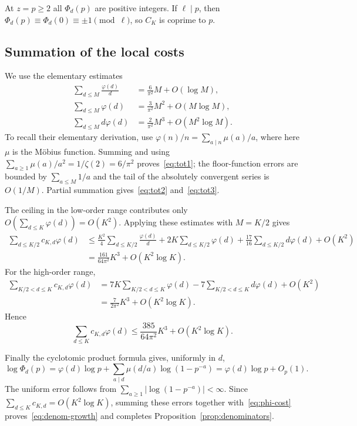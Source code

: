 \documentclass[11pt]{article}
\theoremstyle{remark}
\begin{document}
At $z=p\ge2$ all $\Phi_d(p)$ are positive integers. If $\ell\mid p$,
then $\Phi_d(p)\equiv\Phi_d(0)\equiv\pm1\pmod\ell$, so $C_K$ is
coprime to $p$.

\subsection{Summation of the local costs}

We use the elementary estimates
\begin{align}
 \sum_{d\le M}\frac{\varphi(d)}d
   &=\frac6{\pi^2}M+O(\log M),\label{eq:tot1}\\
 \sum_{d\le M}\varphi(d)
   &=\frac3{\pi^2}M^2+O(M\log M),\label{eq:tot2}\\
 \sum_{d\le M}d\varphi(d)
   &=\frac2{\pi^2}M^3+O(M^2\log M).\label{eq:tot3}
\end{align}
To recall their elementary derivation, use
$\varphi(n)/n=\sum_{a\mid n}\mu(a)/a$, where here $\mu$ is the
M\"obius function. Summing and using
$\sum_{a\ge1}\mu(a)/a^2=1/\zeta(2)=6/\pi^2$ proves~\eqref{eq:tot1};
the floor-function errors are bounded by $\sum_{a\le M}1/a$ and the
tail of the absolutely convergent series is $O(1/M)$.
Partial summation gives~\eqref{eq:tot2} and~\eqref{eq:tot3}.

The ceiling in the low-order range contributes only
$O(\sum_{d\le K}\varphi(d))=O(K^2)$. Applying these estimates with
$M=K/2$ gives
\begin{align*}
 \sum_{d\le K/2}c_{K,d}\varphi(d)
 &\le\frac{K^2}{4}\sum_{d\le K/2}\frac{\varphi(d)}d
   +2K\sum_{d\le K/2}\varphi(d)
   +\frac{17}{16}\sum_{d\le K/2}d\varphi(d)+O(K^2)\\
 &=\frac{161}{64\pi^2}K^3+O(K^2\log K).
\end{align*}
For the high-order range,
\begin{align*}
 \sum_{K/2<d\le K}c_{K,d}\varphi(d)
 &=7K\sum_{K/2<d\le K}\varphi(d)
     -7\sum_{K/2<d\le K}d\varphi(d)+O(K^2)\\
 &=\frac7{2\pi^2}K^3+O(K^2\log K).
\end{align*}
Hence
\begin{equation}\label{eq:phi-cost}
 \sum_{d\le K}c_{K,d}\varphi(d)
 \le\frac{385}{64\pi^2}K^3+O(K^2\log K).
\end{equation}

Finally the cyclotomic product formula gives, uniformly in $d$,
\[
 \log\Phi_d(p)=\varphi(d)\log p
    +\sum_{a\mid d}\mu(d/a)\log(1-p^{-a})
    =\varphi(d)\log p+O_p(1).
\]
The uniform error follows from
$\sum_{a\ge1}|\log(1-p^{-a})|<\infty$.
Since $\sum_{d\le K}c_{K,d}=O(K^2\log K)$, summing these errors
together with~\eqref{eq:phi-cost} proves~\eqref{eq:denom-growth} and
completes Proposition~\ref{prop:denominators}.
\end{document}
